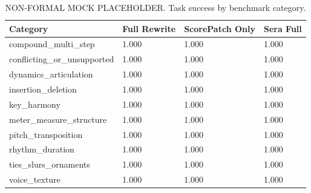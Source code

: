 \begin{table}[t]
\centering
\caption{NON-FORMAL MOCK PLACEHOLDER. Task success by benchmark category.}
\small
\begin{tabular}{llll}
\hline
Category & Full Rewrite & ScorePatch Only & Sera Full \\
\hline
compound\_multi\_step & 1.000 & 1.000 & 1.000 \\
conflicting\_or\_unsupported & 1.000 & 1.000 & 1.000 \\
dynamics\_articulation & 1.000 & 1.000 & 1.000 \\
insertion\_deletion & 1.000 & 1.000 & 1.000 \\
key\_harmony & 1.000 & 1.000 & 1.000 \\
meter\_measure\_structure & 1.000 & 1.000 & 1.000 \\
pitch\_transposition & 1.000 & 1.000 & 1.000 \\
rhythm\_duration & 1.000 & 1.000 & 1.000 \\
ties\_slurs\_ornaments & 1.000 & 1.000 & 1.000 \\
voice\_texture & 1.000 & 1.000 & 1.000 \\
\hline
\end{tabular}
\end{table}
